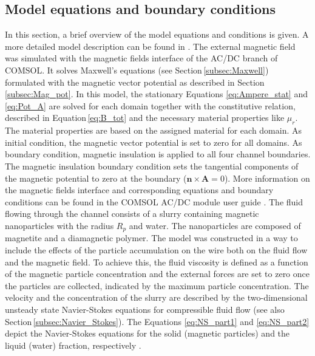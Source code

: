 \subsection{Model equations and boundary conditions}
\label{subsec:model_eq_BC}
In this section, a brief overview of the model equations and conditions is given. A more detailed model description can be found in \cite{choomphon2017simulation}. The external magnetic field was simulated with the magnetic fields interface of the AC/DC branch of COMSOL. It solves Maxwell's equations (see Section\,\ref{subsec:Maxwell}) formulated with the magnetic vector potential as described in Section\,\ref{subsec:Mag_pot}. In this model, the stationary Equations \ref{eq:Ampere_stat} and \ref{eq:Pot_A} are solved for each domain together with the constitutive relation, described in Equation\,\ref{eq:B_tot} and the necessary material properties like $\mu_{r}$. The material properties are based on the assigned material for each domain. As initial condition, the magnetic vector potential is set to zero for all domains.  As boundary condition, magnetic insulation is applied to all four channel boundaries. The magnetic insulation boundary condition sets the tangential components of the magnetic potential to zero at the boundary ($\boldsymbol{n}\times\boldsymbol{A} = 0$). More information on the magnetic fields interface and corresponding equations and boundary conditions can be found in the COMSOL AC/DC module user guide \cite{ComsolACDC}. \newline
The fluid flowing through the channel consists of a slurry containing magnetic nanoparticles with the radius $R_{p}$ and water. The nanoparticles are composed of magnetite and a diamagnetic polymer. The model was constructed in a way to include the effects of the particle accumulation on the wire both on the fluid flow and the magnetic field. To achieve this, the fluid viscosity is defined as a function of the magnetic particle concentration and the external forces are set to zero once the particles are collected, indicated by the maximum particle concentration. The velocity and the concentration of the slurry are described by the two-dimensional unsteady state Navier-Stokes equations for compressible fluid flow (see also Section\,\ref{subsec:Navier_Stokes}). The Equations \ref{eq:NS_part1} and \ref{eq:NS_part2} depict the Navier-Stokes equations for the solid (magnetic particles) and the liquid (water) fraction, respectively \cite{choomphon2017simulation}. 

